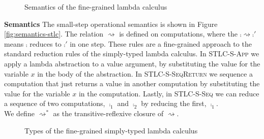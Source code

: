{%

\begin{figure}
\caption{Semantics of the fine-grained lambda calculus}
\centering
{}
\end{figure}

\textbf{Semantics}
The small-step operational semantics is shown in Figure \ref{fig:semantics-stlc}.
The relation $\rightsquigarrow$ is defined on computations, where the $\comp \rightsquigarrow \comp'$ means $\comp$ reduces to $\comp'$ in one step.
These rules are a fine-grained approach to the standard reduction rules of the simply-typed lambda calculus.
In {\footnotesize\textsc{STLC-S-App}} we apply a lambda abstraction to a value argument, by substituting the value for the variable $x$ in the body of the abstraction.
In {\footnotesize\textsc{STLC-S-SeqReturn}} we sequence a computation that just returns a value in another computation by substituting the value for the variable $x$ in the computation.
Lastly, in {\footnotesize\textsc{STLC-S-Seq}} we can reduce a sequence of two computations, $\comp_1$ and $\comp_2$ by reducing the first, $\comp_1$.
\\
We define $\rightsquigarrow^*$ as the transitive-reflexive closure of $\rightsquigarrow$. 


\begin{figure}
\caption{Types of the fine-grained simply-typed lambda calculus}
\centering
{}
\end{figure}

}
